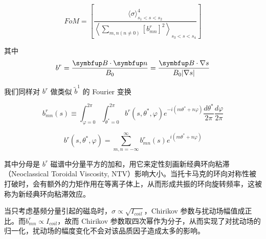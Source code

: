   \begin{equation}
    FoM=\left[\frac{\langle\sigma\rangle_{s_{1}<s<s_{2}}^{4}}{\left\langle\sum_{m, n(n \neq 0)}\left[b_{m n}^{r}\right]^{2}\right\rangle_{s_{3}<s<s_{4}}}\right]
  \end{equation}

  其中
\begin{equation}
  b^r = \frac{\vect{B}\cdot\vect{n}}{B_0} = \frac{\vect{B}\cdot \nabla s}{B_0 |\nabla s|}
\end{equation}

我们同样对 $b^r$ 做类似 $\tilde{b}^1$ 的 Fourier 变换

\begin{equation}
  b_{m n}^{r}(s) \equiv \int_{\varphi=0}^{2 \pi} \int_{\theta^{*}=0}^{2 \pi} b^{r}\left(s, \theta^{*}, \varphi\right) e^{-i\left(m \theta^{*}+n \varphi\right)} \frac{d \theta^{*}}{2 \pi} \frac{d \varphi}{2 \pi}
\end{equation}

\begin{equation}
  b^{r}\left(s, \theta^{*}, \varphi\right)=\sum_{m, n=-\infty}^{\infty} b_{m n}^{r}(s) e^{i\left(m \theta^{*}+n \varphi\right)}
\end{equation}

  
其中分母是 $b^r$ 磁谱中分量平方的加和，用它来定性刻画新经典环向粘滞（Neoclassical Toroidal Viscosity, NTV）影响大小。当托卡马克的环向对称性被打破时，会有额外的力矩作用在等离子体上，从而形成共振的环向旋转频率，这被称为新经典环向粘滞效应。

当只考虑基频分量引起的磁岛时，$\sigma\propto \sqrt{I_{coil}}$，Chirikov 参数与扰动场幅值成正比。而$b^r_{mn}\propto I_{coil}$，故而 Chirikov 参数取四次幂作为分子，从而实现了对扰动场的归一化，扰动场的幅度变化不会对该品质因子造成太多的影响。





    
